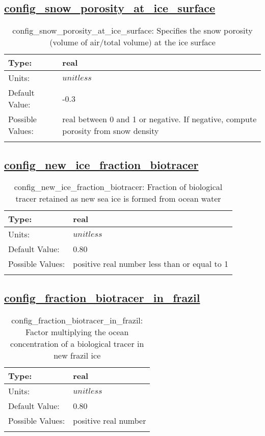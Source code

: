 \subsection[config\_snow\_porosity\_at\_ice\_surface]{\hyperref[sec:nm_tab_biogeochemistry]{config\_snow\_porosity\_at\_ice\_surface}}
\label{subsec:nm_sec_config_snow_porosity_at_ice_surface}
\begin{center}
\begin{longtable}{| p{2.0in} || p{4.0in} |}
    \hline
    Type: & real \\
    \hline
    Units: & $unitless$ \\
    \hline
    Default Value: & -0.3 \\
    \hline
    Possible Values: & real between 0 and 1 or negative.  If negative, compute porosity from snow density \\
    \hline
    \caption{config\_snow\_porosity\_at\_ice\_surface: Specifies the snow porosity (volume of air/total volume) at the ice surface}
\end{longtable}
\end{center}
\subsection[config\_new\_ice\_fraction\_biotracer]{\hyperref[sec:nm_tab_biogeochemistry]{config\_new\_ice\_fraction\_biotracer}}
\label{subsec:nm_sec_config_new_ice_fraction_biotracer}
\begin{center}
\begin{longtable}{| p{2.0in} || p{4.0in} |}
    \hline
    Type: & real \\
    \hline
    Units: & $unitless$ \\
    \hline
    Default Value: & 0.80 \\
    \hline
    Possible Values: & positive real number less than or equal to 1 \\
    \hline
    \caption{config\_new\_ice\_fraction\_biotracer: Fraction of biological tracer retained as new sea ice is formed from ocean water}
\end{longtable}
\end{center}
\subsection[config\_fraction\_biotracer\_in\_frazil]{\hyperref[sec:nm_tab_biogeochemistry]{config\_fraction\_biotracer\_in\_frazil}}
\label{subsec:nm_sec_config_fraction_biotracer_in_frazil}
\begin{center}
\begin{longtable}{| p{2.0in} || p{4.0in} |}
    \hline
    Type: & real \\
    \hline
    Units: & $unitless$ \\
    \hline
    Default Value: & 0.80 \\
    \hline
    Possible Values: & positive real number \\
    \hline
    \caption{config\_fraction\_biotracer\_in\_frazil: Factor multiplying the ocean concentration of a biological tracer in new frazil ice}
\end{longtable}
\end{center}
